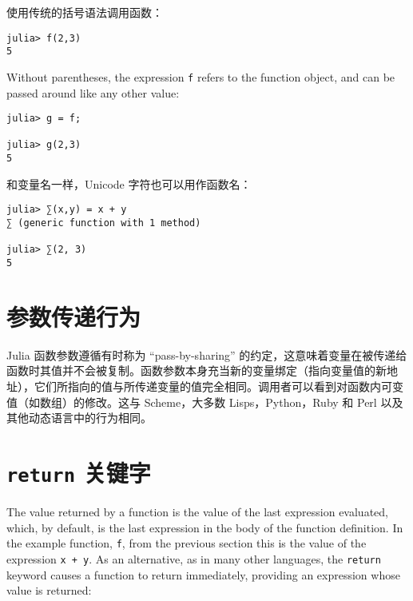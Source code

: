使用传统的括号语法调用函数：




\begin{verbatim}
julia> f(2,3)
5
\end{verbatim}



Without parentheses, the expression \texttt{f} refers to the function object, and can be passed around like any other value:




\begin{verbatim}
julia> g = f;

julia> g(2,3)
5
\end{verbatim}



和变量名一样，Unicode 字符也可以用作函数名：




\begin{verbatim}
julia> ∑(x,y) = x + y
∑ (generic function with 1 method)

julia> ∑(2, 3)
5
\end{verbatim}



\hypertarget{7147748673565495429}{}


\section{参数传递行为}



Julia 函数参数遵循有时称为 “pass-by-sharing” 的约定，这意味着变量在被传递给函数时其值并不会被复制。函数参数本身充当新的变量绑定（指向变量值的新地址），它们所指向的值与所传递变量的值完全相同。调用者可以看到对函数内可变值（如数组）的修改。这与 Scheme，大多数 Lisps，Python，Ruby 和 Perl 以及其他动态语言中的行为相同。



\hypertarget{8101712267958021215}{}


\section{\texttt{return} 关键字}



The value returned by a function is the value of the last expression evaluated, which, by default, is the last expression in the body of the function definition. In the example function, \texttt{f}, from the previous section this is the value of the expression \texttt{x + y}. As an alternative, as in many other languages, the \texttt{return} keyword causes a function to return immediately, providing an expression whose value is returned:




